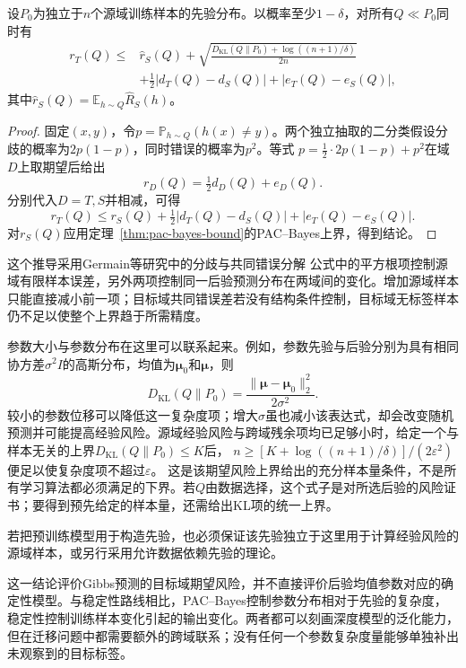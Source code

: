 \begin{theorem}[参数分布的跨域期望风险界]
\label{thm:transfer-pac-bayes}
设$P_0$为独立于$n$个源域训练样本的先验分布。以概率至少$1-\delta$，对所有$Q\ll P_0$同时有
\begin{equation}
 \begin{aligned}
 r_T(Q)\leq{}&\widehat r_S(Q)
 +\sqrt{\frac{D_{\mathrm{KL}}(Q\|P_0)+\log((n+1)/\delta)}{2n}}\\
 &+\tfrac12|d_T(Q)-d_S(Q)|+|e_T(Q)-e_S(Q)|,
 \end{aligned}
 \label{eq:transfer-pac-bayes}
\end{equation}
其中$\widehat r_S(Q)=\mathbb E_{h\sim Q}\hat R_S(h)$。
\end{theorem}
\begin{proof}
固定$(x,y)$，令$p=\mathbb P_{h\sim Q}(h(x)\neq y)$。两个独立抽取的二分类假设分歧的概率为$2p(1-p)$，同时错误的概率为$p^2$。等式
$p=\tfrac12\cdot2p(1-p)+p^2$在域$D$上取期望后给出
\[
 r_D(Q)=\tfrac12d_D(Q)+e_D(Q).
\]
分别代入$D=T,S$并相减，可得
\[
 r_T(Q)\leq r_S(Q)+\tfrac12|d_T(Q)-d_S(Q)|+|e_T(Q)-e_S(Q)|.
\]
对$r_S(Q)$应用定理~\ref{thm:pac-bayes-bound}的PAC--Bayes上界，得到结论。
\end{proof}

这个推导采用Germain等研究中的分歧与共同错误分解 公式中的平方根项控制源域有限样本误差，另外两项控制同一后验预测分布在两域间的变化。增加源域样本只能直接减小前一项；目标域共同错误差若没有结构条件控制，目标域无标签样本仍不足以使整个上界趋于所需精度。

参数大小与参数分布在这里可以联系起来。例如，参数先验与后验分别为具有相同协方差$\sigma^2 I$的高斯分布，均值为$\bm\mu_0$和$\bm\mu$，则
\[
 D_{\mathrm{KL}}(Q\|P_0)=\frac{\|\bm\mu-\bm\mu_0\|_2^2}{2\sigma^2}.
\]
较小的参数位移可以降低这一复杂度项；增大$\sigma$虽也减小该表达式，却会改变随机预测并可能提高经验风险。源域经验风险与跨域残余项均已足够小时，给定一个与样本无关的上界$D_{\mathrm{KL}}(Q\|P_0)\leq K$后，
$n\geq[K+\log((n+1)/\delta)]/(2\varepsilon^2)$便足以使复杂度项不超过$\varepsilon$。
这是该期望风险上界给出的充分样本量条件，不是所有学习算法都必须满足的下界。若$Q$由数据选择，这个式子是对所选后验的风险证书；要得到预先给定的样本量，还需给出KL项的统一上界。

若把预训练模型用于构造先验，也必须保证该先验独立于这里用于计算经验风险的源域样本，或另行采用允许数据依赖先验的理论。

这一结论评价Gibbs预测的目标域期望风险，并不直接评价后验均值参数对应的确定性模型。与稳定性路线相比，PAC--Bayes控制参数分布相对于先验的复杂度，稳定性控制训练样本变化引起的输出变化。两者都可以刻画深度模型的泛化能力，但在迁移问题中都需要额外的跨域联系；没有任何一个参数复杂度量能够单独补出未观察到的目标标签。

